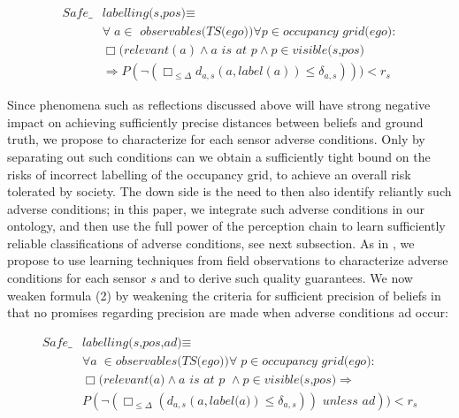 \begin{align}\label{eq:safelabelling(s,pos)}
    \textit{Safe}\_&\textit{labelling(s,pos)} \equiv 					\\		
 & \forall a\in\textit{ observables(TS(ego))}\forall p \in \textit{occupancy grid(ego)}:\nonumber\\  
& \Box (\textit{relevant}(a) \land a \textit{ is at } p\land p\in \textit{visible(s,pos)} \nonumber\\
& \Rightarrow P(\neg( \Box_{\leq\Delta} d_{a,s}(a,\textit{label}(a))\leq\delta_{a,s}))) < r_s\nonumber
\end{align}

Since phenomena such as reflections discussed above will have strong negative impact on achieving sufficiently precise distances between beliefs and ground truth, we propose to characterize for each sensor adverse conditions. Only by separating out such conditions can we obtain a sufficiently tight bound on the risks of incorrect labelling of the occupancy grid, to achieve an overall risk tolerated by society. The down side is the need to then also identify reliantly such adverse conditions; in this paper, we integrate such adverse conditions in our ontology, and then use the full power of the perception chain to learn sufficiently reliable classifications of adverse conditions, see next subsection. As in \cite{galbas}, we propose to use learning techniques from field observations to characterize adverse conditions for each sensor \textit{s} and to derive such quality guarantees. We now weaken formula (2) by weakening the criteria for sufficient precision of beliefs in that no promises regarding precision are made when adverse conditions ad occur:

\begin{align}\label{eq:safelabelling(s,pos,ad)}
\textit{Safe}\_&\textit{labelling(s,pos,ad)} \equiv\\  			
&\forall a\in \textit{observables(TS(ego))}\forall p\in\textit{occupancy grid(ego)}\nonumber:\\
&\Box(\textit{relevant(a)} \land a\textit{ is at p }\land p\in\textit{visible(s,pos)} \Rightarrow\nonumber\\
&P(\neg(\Box_{\leq\Delta} (d_{a,s}(a, \textit{label(a)})\leq \delta_{a,s}))\textit{ unless } ad)) < r_s\nonumber
\end{align}

